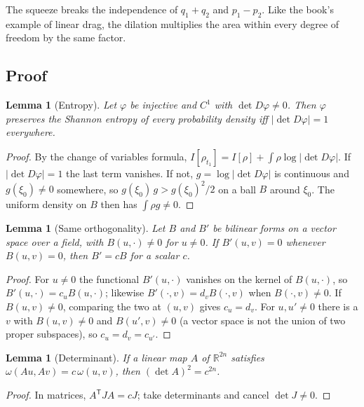 \documentclass[11pt]{article}
\newtheorem{lemma}[theorem]{Lemma}
\theoremstyle{definition}
\theoremstyle{remark}
\begin{document}
The squeeze breaks the independence of $q_1 + q_2$ and $p_1 - p_2$. Like the book's example of
linear drag, the dilation multiplies the area within every degree of freedom by the same
factor.

\subsection{Proof}

\begin{lemma}[Entropy]\label{lem:entropy}
  Let $\varphi$ be injective and $C^1$ with $\det D\varphi \ne 0$. Then $\varphi$ preserves the
  Shannon entropy of every probability density iff $|\det D\varphi| = 1$ everywhere.
\end{lemma}

\begin{proof}
  By the change of variables formula, $I[\rho_{t_1}] = I[\rho] + \int\rho\log|\det D\varphi|$.
  If $|\det D\varphi| = 1$ the last term vanishes. If not, $g = \log|\det D\varphi|$ is continuous
  and $g(\xi_0) \ne 0$ somewhere, so $g(\xi_0)\,g > g(\xi_0)^2/2$ on a ball $B$ around $\xi_0$.
  The uniform density on $B$ then has $\int\rho g \ne 0$.
\end{proof}

\begin{lemma}[Same orthogonality]\label{lem:ortho}
  Let $B$ and $B'$ be bilinear forms on a vector space over a field, with $B(u, \cdot) \ne 0$ for
  $u \ne 0$. If $B'(u, v) = 0$ whenever $B(u, v) = 0$, then $B' = cB$ for a scalar $c$.
\end{lemma}

\begin{proof}
  For $u \ne 0$ the functional $B'(u, \cdot)$ vanishes on the kernel of $B(u, \cdot)$, so
  $B'(u, \cdot) = c_u B(u, \cdot)$; likewise $B'(\cdot, v) = d_v B(\cdot, v)$ when
  $B(\cdot, v) \ne 0$. If $B(u, v) \ne 0$, comparing the two at $(u, v)$ gives $c_u = d_v$. For
  $u, u' \ne 0$ there is a $v$ with $B(u, v) \ne 0$ and $B(u', v) \ne 0$ (a vector space is not
  the union of two proper subspaces), so $c_u = d_v = c_{u'}$.
\end{proof}

\begin{lemma}[Determinant]\label{lem:det}
  If a linear map $A$ of $\mathbb R^{2n}$ satisfies $\omega(Au, Av) = c\,\omega(u, v)$, then
  $(\det A)^2 = c^{2n}$.
\end{lemma}

\begin{proof}
  In matrices, $A^{\mathsf T}JA = cJ$; take determinants and cancel $\det J \ne 0$.
\end{proof}
\end{document}
